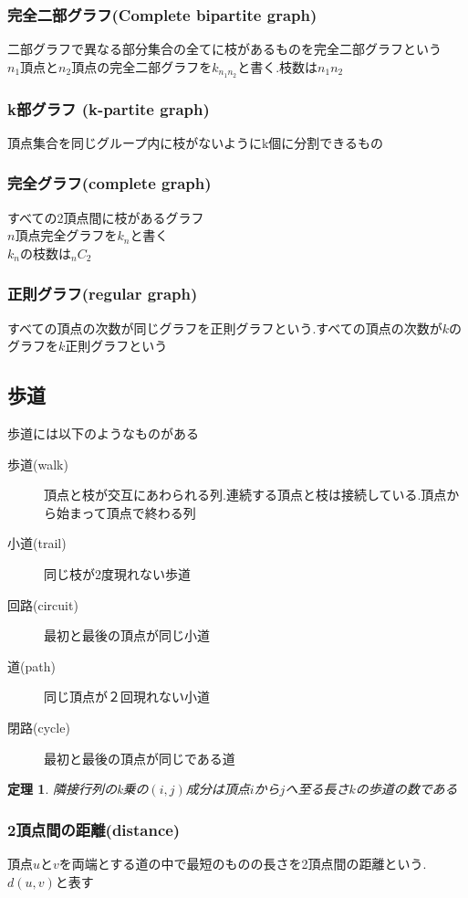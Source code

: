\documentclass[a4j,10.5pt]{jarticle}
\newtheorem{theo}{定理}[section]
\begin{document}
\subsubsection*{完全二部グラフ(Complete bipartite graph)}
二部グラフで異なる部分集合の全てに枝があるものを完全二部グラフという\\
$n_1$頂点と$n_2$頂点の完全二部グラフを$k_{n_1 n_2}$と書く.枝数は$n_1n_2$

\subsubsection*{k部グラフ (k-partite graph)}
頂点集合を同じグループ内に枝がないようにk個に分割できるもの

\subsubsection*{完全グラフ(complete graph)}
すべての2頂点間に枝があるグラフ\\
$n$頂点完全グラフを$k_n$と書く\\
$k_n$の枝数は${}_nC_2$

\subsubsection*{正則グラフ(regular graph)}
すべての頂点の次数が同じグラフを正則グラフという.すべての頂点の次数が$k$のグラフを$k$正則グラフという

\subsection{歩道}
歩道には以下のようなものがある
\begin{description}
\item[歩道(walk)] 頂点と枝が交互にあわられる列.連続する頂点と枝は接続している.頂点から始まって頂点で終わる列
\item[小道(trail)] 同じ枝が2度現れない歩道
\item[回路(circuit)] 最初と最後の頂点が同じ小道
\item[道(path)] 同じ頂点が２回現れない小道
\item[閉路(cycle)] 最初と最後の頂点が同じである道
\end{description}

\begin{theo}
隣接行列のk乗の$(i,j)$成分は頂点$i$から$j$へ至る長さ$k$の歩道の数である
\end{theo}

\subsubsection{2頂点間の距離(distance)}
頂点$u$と$v$を両端とする道の中で最短のものの長さを2頂点間の距離という.$d(u,v)$と表す
\end{document}
